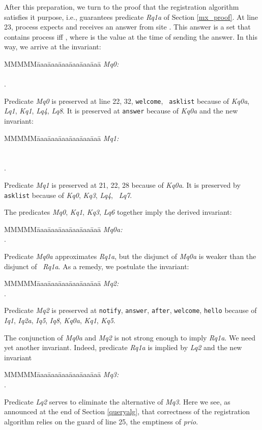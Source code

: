 \documentclass[10pt]{article} \usepackage[english]{babel}
\newenvironment{tab}{\begin{tabbing}
MMMMM\=aaa\=aaa\=aaa\=aaa\=aaa\=aaa\= \kill}{\end{tabbing}}
\def\S #1/{\mbox {\textsl{#1}}}
\def\T #1/{\mbox {\texttt{#1}}}
\begin{document}
After this preparation, we turn to the proof that the registration
algorithm satisfies it purpose, i.e., guarantees predicate \S Rq1a/ of
Section \ref{mx_proof}.  At line 23, process  expects and receives
an answer from site .  This answer is a set that contains process
 iff , where  is
the value at the time of sending the answer.  In this way, we arrive
at the invariant:
\begin{tab}
  \S Mq0:/ \> \\
  \>  \\
  \>  .
\end{tab}
Predicate \S Mq0/ is preserved at line 22, 32, \T welcome/, \T
asklist/ because of \S Kq0a/, \S Lq1/, \S Kq1/, \S Lq4/, \S Lq8/.  It
is preserved at \T answer/ because of \S Kq0a/ and the new invariant:
\begin{tab}
  \S Mq1:/ \>  \\
  \> \\
  \>  \\
  \>  .
\end{tab}
Predicate \S Mq1/ is preserved at 21, 22, 28 because of \S Kq0a/.  It
is preserved by \T asklist/ because of \S Kq0/, \S Kq3/, \S Lq4/, \S
Lq7/.

The predicates \S Mq0/, \S Kq1/, \S Kq3/, \S Lq6/ together imply the
derived invariant:
\begin{tab}
  \S Mq0a:/ \>  \\
  \>  .
\end{tab}
Predicate \S Mq0a/ approximates \S Rq1a/, but the disjunct  of \S Mq0a/ is weaker than the disjunct  of \S
Rq1a/.  As a remedy, we postulate the invariant:
\begin{tab}
  \S Mq2:/ \> \\
  \>  .
\end{tab}
Predicate \S Mq2/ is preserved at \T notify/, \T answer/, \T after/,
\T welcome/, \T hello/ because of \S Iq1/, \S Iq2a/, \S Iq5/, \S Iq8/,
\S Kq0a/, \S Kq1/, \S Kq5/.

The conjunction of \S Mq0a/ and \S Mq2/ is not strong enough to imply
\S Rq1a/.  We need yet another invariant. Indeed, predicate \S Rq1a/
is implied by \S Lq2/ and the new invariant
\begin{tab}
  \S Mq3:/ \>  \\
  \>  .
\end{tab}
Predicate \S Lq2/ serves to eliminate the alternative 
of \S Mq3/.  Here we see, as announced at the end of Section
\ref{queryalg}, that correctness of the registration algorithm relies
on the guard of line 25, the emptiness of \S prio/.
\end{document}
